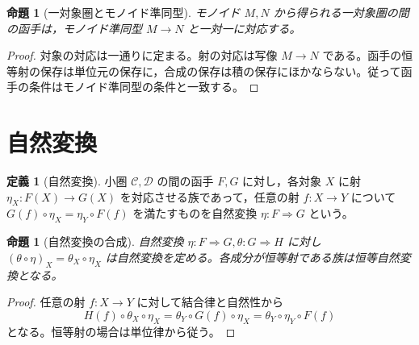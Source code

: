 \documentclass[a5paper,10pt,dvipdfmx]{jsarticle}
\theoremstyle{definition}
\newtheorem{defn}[ruledef]{定義}
\theoremstyle{plain}
\newtheorem{prop}[ruledef]{命題}
\begin{document}
\begin{prop}[一対象圏とモノイド準同型]\label{k248}
モノイド $M,N$ から得られる一対象圏の間の函手は，モノイド準同型 $M\to N$ と一対一に対応する。
\end{prop}
\begin{proof}
対象の対応は一通りに定まる。射の対応は写像 $M\to N$ である。函手の恒等射の保存は単位元の保存に，合成の保存は積の保存にほかならない。従って函手の条件はモノイド準同型の条件と一致する。
\end{proof}

\section{自然変換}
\begin{defn}[自然変換]\label{k277}
小圏 $\mathcal C,\mathcal D$ の間の函手 $F,G$ に対し，各対象 $X$ に射 $\eta_X\colon F(X)\to G(X)$ を対応させる族であって，任意の射 $f\colon X\to Y$ について $G(f)\circ\eta_X=\eta_Y\circ F(f)$ を満たすものを自然変換 $\eta\colon F\Rightarrow G$ という。
\end{defn}
\begin{prop}[自然変換の合成]\label{k278}
自然変換 $\eta\colon F\Rightarrow G,\theta\colon G\Rightarrow H$ に対し $(\theta\circ\eta)_X=\theta_X\circ\eta_X$ は自然変換を定める。各成分が恒等射である族は恒等自然変換となる。
\end{prop}
\begin{proof}
任意の射 $f\colon X\to Y$ に対して結合律と自然性から
\[
 H(f)\circ\theta_X\circ\eta_X
 =\theta_Y\circ G(f)\circ\eta_X
 =\theta_Y\circ\eta_Y\circ F(f)
\]
となる。恒等射の場合は単位律から従う。
\end{proof}
\end{document}
